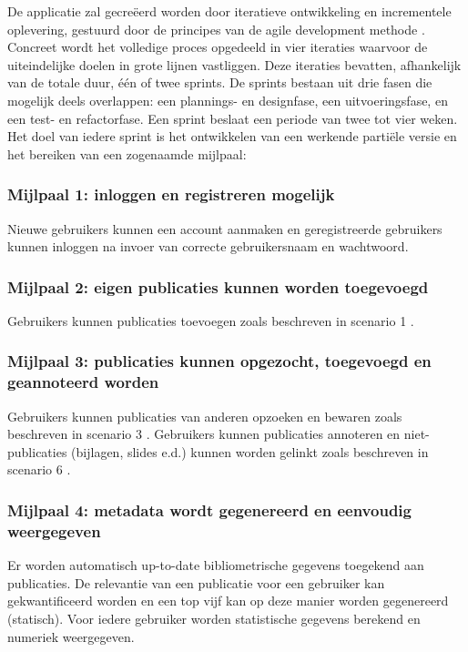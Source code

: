\documentclass{article}
\begin{document}
De applicatie zal gecre\"{e}erd worden door iteratieve ontwikkeling en incrementele oplevering, gestuurd door de principes van de agile development methode \cite{website:agile-process} . Concreet wordt het volledige proces opgedeeld in vier iteraties waarvoor de uiteindelijke doelen in grote lijnen vastliggen. Deze iteraties bevatten, afhankelijk van de totale duur, \'{e}\'{e}n of twee sprints. De sprints bestaan uit drie fasen die mogelijk deels overlappen: een plannings- en designfase, een uitvoeringsfase, en een test- en refactorfase. Een sprint beslaat een periode van twee tot vier weken. Het doel van iedere sprint is het ontwikkelen van een werkende parti\"{e}le versie en het bereiken van een zogenaamde mijlpaal:

\subsubsection*{Mijlpaal 1: inloggen en registreren mogelijk}

Nieuwe gebruikers kunnen een account aanmaken en geregistreerde gebruikers kunnen inloggen na invoer van correcte gebruikersnaam en wachtwoord.

\subsubsection*{Mijlpaal 2: eigen publicaties kunnen worden toegevoegd}
Gebruikers kunnen publicaties toevoegen zoals beschreven in scenario 1  \citep{Xtreport:organisatie}.
\subsubsection*{Mijlpaal 3: publicaties kunnen opgezocht, toegevoegd en geannoteerd worden}
Gebruikers kunnen publicaties van anderen opzoeken en bewaren zoals beschreven in scenario 3 \citep{Xtreport:organisatie}. Gebruikers kunnen publicaties annoteren en niet-publicaties (bijlagen, slides e.d.) kunnen worden gelinkt zoals beschreven in scenario 6 \citep{Xtreport:organisatie}.

\subsubsection*{Mijlpaal 4: metadata wordt gegenereerd en eenvoudig weergegeven}
Er worden automatisch up-to-date bibliometrische gegevens toegekend aan publicaties.
De relevantie van een publicatie voor een gebruiker kan gekwantificeerd worden en een top vijf kan op deze manier worden gegenereerd (statisch).
Voor iedere gebruiker worden statistische gegevens berekend en numeriek weergegeven.
\end{document}
